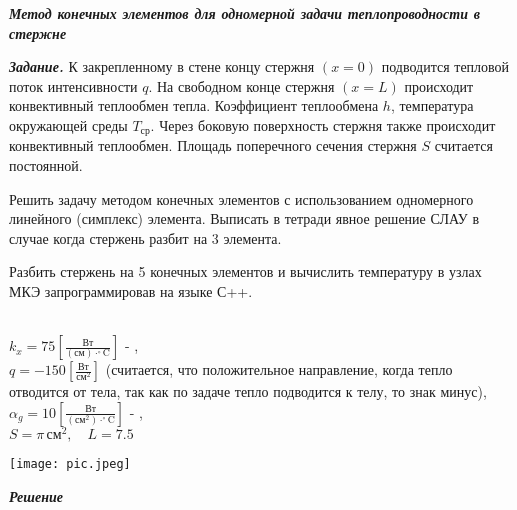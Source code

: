 \documentclass[a4paper, 12pt]{article}
\begin{document}
\begin{center}
\textbf{\textit{Метод конечных элементов для одномерной задачи теплопроводности в стержне}}
\end{center}
\textbf{\textit{Задание.}} К закрепленному в стене концу стержня $(x=0)$ подводится тепловой поток интенсивности $q$. На свободном конце стержня $(x=L)$ происходит конвективный теплообмен тепла. Коэффициент теплообмена $h$, температура окружающей среды $T_{\text{ср}}$. Через боковую поверхность стержня также происходит конвективный теплообмен. Площадь поперечного сечения стержня $S$ считается постоянной.

Решить задачу методом конечных элементов с использованием одномерного линейного (симплекс) элемента. Выписать в тетради явное решение СЛАУ в случае когда стержень разбит на 3 элемента.

Разбить стержень на 5 конечных элементов и вычислить температуру в узлах МКЭ запрограммировав на языке С++.

 \\

$k_x = 75 \left[\frac{\text{Вт}}{(\text{см}) \cdot ^\circ \text{C}}\right]$ \quad - , \\

$q = -150 \left[\frac{\text{Вт}}{\text{см}^2}\right]$ \quad (считается, что положительное направление, когда тепло отводится от тела, так как по задаче тепло подводится к телу, то знак минус), \\

$\alpha_g = 10 \left[\frac{\text{Вт}}{(\text{см}^2) \cdot ^\circ \text{C}}\right]$ \quad - , \\

$S = \pi \, \text{см}^2, \quad L = 7.5 \,$ 

\begin{center}
\texttt{[image: pic.jpeg]}
\end{center}

\begin{center}
\textbf{\textit{Решение}}
\end{center}
\end{document}

